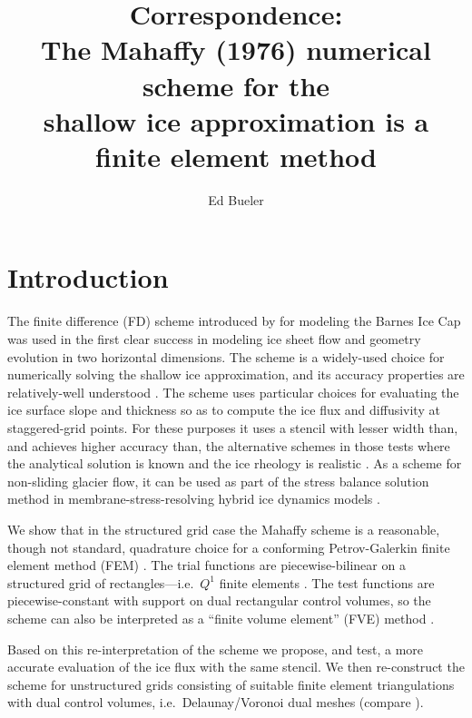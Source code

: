 \documentclass[11pt]{amsart}
\title[Correspondence: The Mahaffy scheme is a finite element method]{Correspondence: \\ The Mahaffy (1976) numerical scheme for the \\ shallow ice approximation is a finite element method}
\author{Ed Bueler}
\begin{document}

\maketitle

\thispagestyle{empty}


\section{Introduction}

The finite difference (FD) scheme introduced by \cite{Mahaffy1976} for modeling the Barnes Ice Cap was used in the first clear success in modeling ice sheet flow and geometry evolution in two horizontal dimensions.  The scheme is a widely-used choice for numerically solving the shallow ice approximation, and its accuracy properties are relatively-well understood \cite{Bueleretal2005}.  The scheme uses particular choices for evaluating the ice surface slope and thickness so as to compute the ice flux and diffusivity at staggered-grid points.  For these purposes it uses a stencil with lesser width than, and achieves higher accuracy than, the alternative schemes in those tests where the analytical solution is known and the ice rheology is realistic \cite{HindmarshPayne1996}.  As a scheme for non-sliding glacier flow, it can be used as part of the stress balance solution method in membrane-stress-resolving hybrid ice dynamics models \cite{BuelerBrown2009}.

We show that in the structured grid case the Mahaffy scheme is a reasonable, though not standard, quadrature choice for a conforming Petrov-Galerkin finite element method (FEM) \cite{Elmanetal2005}.  The trial functions are piecewise-bilinear on a structured grid of rectangles---i.e.~$Q^1$ finite elements \cite{Elmanetal2005}.  The test functions are piecewise-constant with support on dual rectangular control volumes, so the scheme can also be interpreted as a ``finite volume element'' (FVE) method \cite{EwingLinLin2002}.

Based on this re-interpretation of the scheme we propose, and test, a more accurate evaluation of the ice flux with the same stencil.  We then re-construct the scheme for unstructured grids consisting of suitable finite element triangulations with dual control volumes, i.e.~Delaunay/Voronoi dual meshes (compare \cite{Ringleretal2013}).
\end{document}

